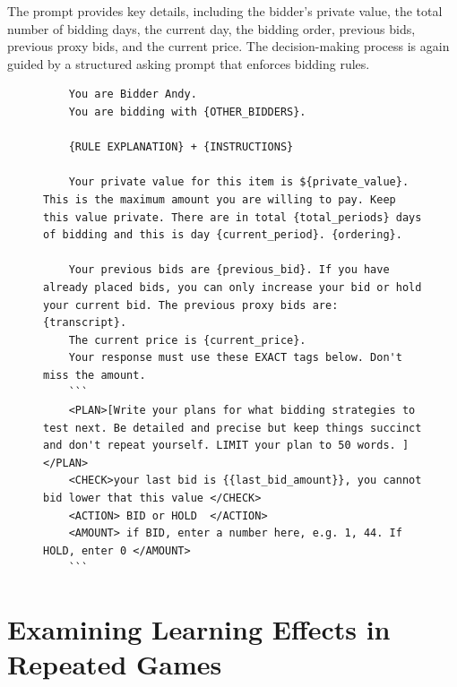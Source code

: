 \documentclass{article} %
\begin{document}
The prompt provides key details, including the bidder's private value, the total number of bidding days, the current day, the bidding order, previous bids, previous proxy bids, and the current price. The decision-making process is again guided by a structured asking prompt that enforces bidding rules.
\begin{figure}[H]
\centering
\begin{minipage}{0.95\textwidth}
\begin{lstlisting}
    You are Bidder Andy.
    You are bidding with {OTHER_BIDDERS}.

    {RULE EXPLANATION} + {INSTRUCTIONS}

    Your private value for this item is ${private_value}. This is the maximum amount you are willing to pay. Keep this value private. There are in total {total_periods} days  of bidding and this is day {current_period}. {ordering}.

    Your previous bids are {previous_bid}. If you have already placed bids, you can only increase your bid or hold your current bid. The previous proxy bids are: {transcript}.
    The current price is {current_price}.
    Your response must use these EXACT tags below. Don't miss the amount.
    ```
    <PLAN>[Write your plans for what bidding strategies to test next. Be detailed and precise but keep things succinct and don't repeat yourself. LIMIT your plan to 50 words. ]</PLAN>
    <CHECK>your last bid is {{last_bid_amount}}, you cannot bid lower that this value </CHECK>
    <ACTION> BID or HOLD  </ACTION>
    <AMOUNT> if BID, enter a number here, e.g. 1, 44. If HOLD, enter 0 </AMOUNT>
    ```
\end{lstlisting}
\end{minipage}
\label{fig:ebay_prompt}
\end{figure}



\section{Examining Learning Effects in Repeated Games}\label{app:learning}
\end{document}
